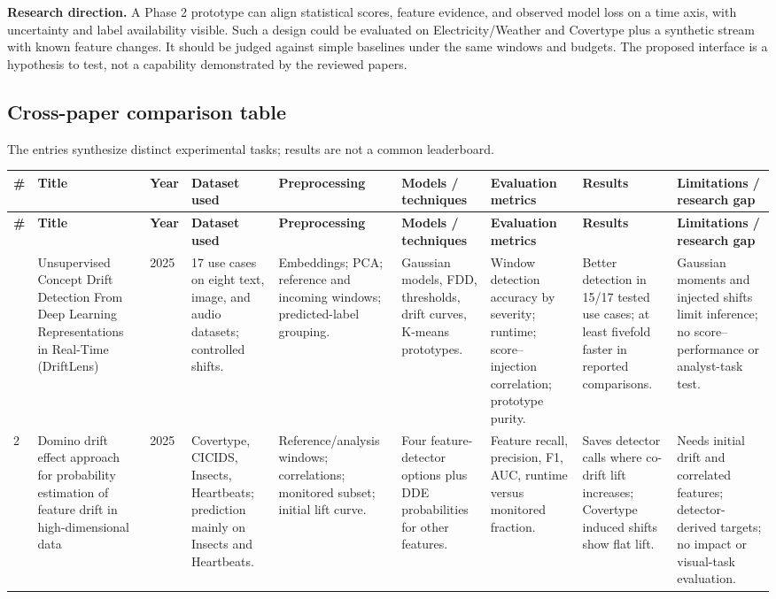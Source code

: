 \documentclass[10pt,a4paper]{article}
\renewcommand{\arraystretch}{1.1}
\begin{document}
\textbf{Research direction.} A Phase 2 prototype can align statistical scores, feature evidence, and observed model loss on a time axis, with uncertainty and label availability visible. Such a design could be evaluated on Electricity/Weather and Covertype plus a synthetic stream with known feature changes. It should be judged against simple baselines under the same windows and budgets. The proposed interface is a hypothesis to test, not a capability demonstrated by the reviewed papers.

\clearpage
\begin{landscape}
\section*{Cross-paper comparison table}
\noindent\footnotesize The entries synthesize distinct experimental tasks; results are not a common leaderboard.
\vspace{3pt}
\small
\renewcommand{\arraystretch}{1.1}
\begin{longtable}{L{0.45cm}L{3.05cm}L{1.15cm}L{2.95cm}L{3.05cm}L{2.95cm}L{2.95cm}L{3.0cm}L{3.95cm}}
\toprule
{}\textbf{\#} & \textbf{Title} & \textbf{Year} & \textbf{Dataset used} & \textbf{Preprocessing} & \textbf{Models / techniques} & \textbf{Evaluation metrics} & \textbf{Results} & \textbf{Limitations / research gap}\\
\midrule\endfirsthead
{}\textbf{\#} & \textbf{Title} & \textbf{Year} & \textbf{Dataset used} & \textbf{Preprocessing} & \textbf{Models / techniques} & \textbf{Evaluation metrics} & \textbf{Results} & \textbf{Limitations / research gap}\\
\midrule\endhead
\bottomrule{} & Unsupervised Concept Drift Detection From Deep Learning Representations in Real-Time (DriftLens) & 2025 & 17 use cases on eight text, image, and audio datasets; controlled shifts. & Embeddings; PCA; reference and incoming windows; predicted-label grouping. & Gaussian models, FDD, thresholds, drift curves, K-means prototypes. & Window detection accuracy by severity; runtime; score--injection correlation; prototype purity. & Better detection in 15/17 tested use cases; at least fivefold faster in reported comparisons. & Gaussian moments and injected shifts limit inference; no score--performance or analyst-task test.\\[5pt]
2 & Domino drift effect approach for probability estimation of feature drift in high-dimensional data & 2025 & Covertype, CICIDS, Insects, Heartbeats; prediction mainly on Insects and Heartbeats. & Reference/analysis windows; correlations; monitored subset; initial lift curve. & Four feature-detector options plus DDE probabilities for other features. & Feature recall, precision, F1, AUC, runtime versus monitored fraction. & Saves detector calls where co-drift lift increases; Covertype induced shifts show flat lift. & Needs initial drift and correlated features; detector-derived targets; no impact or visual-task evaluation.\\[5pt]

\end{longtable}
\end{landscape}
\end{document}
